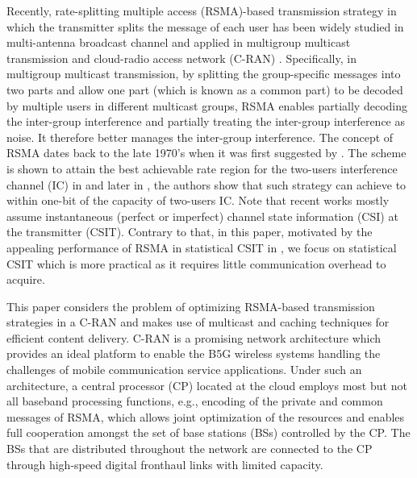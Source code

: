 \documentclass[12pt,draftcls,onecolumn]{IEEEtran}
\theoremstyle{remark}
\theoremstyle{definition}
\begin{document}
Recently, rate-splitting multiple access (RSMA)-based transmission strategy in which the transmitter splits the message of each user has been widely studied in multi-antenna broadcast channel \cite{9158344} and applied in multigroup multicast transmission \cite{8019852} and cloud-radio access network (C-RAN) \cite{9217249}. %
Specifically, in multigroup multicast transmission, by splitting the group-specific messages into two parts and allow one part (which is known as a common part) to be decoded by multiple users in different multicast groups, RSMA enables partially decoding the inter-group interference and partially treating the inter-group interference as noise. It therefore better manages the inter-group interference. 
The concept of RSMA dates back to the late 1970's when it was first suggested by \cite{Carleial78}. The scheme is shown to attain the best achievable rate region for the two-users interference channel (IC) in \cite{1056307} and later in \cite{4675741}, the authors show that such strategy can achieve to within one-bit of the capacity of two-users IC. Note that recent works mostly assume instantaneous (perfect or imperfect) channel state information (CSI) at the transmitter (CSIT). Contrary to that, in this paper, motivated by the appealing performance of RSMA in statistical CSIT in \cite{ahmad2020rate,yin2021ratesplitting}, we focus on statistical CSIT which is more practical as it requires little communication overhead to acquire.  %

This paper considers the problem of optimizing RSMA-based transmission strategies in a C-RAN and makes use of multicast and caching techniques for efficient content delivery. C-RAN is a promising network architecture which provides an ideal platform to enable the B5G wireless systems handling the challenges of mobile communication service applications. 
Under such an architecture, a central processor (CP) located at the cloud employs most but not all baseband processing functions, e.g., encoding of the private and common messages of RSMA, which allows joint optimization of the resources and enables full cooperation amongst the set of base stations (BSs) controlled by the CP. The BSs that are distributed throughout the network are connected to the CP through high-speed digital fronthaul links with limited capacity. 
\end{document}
